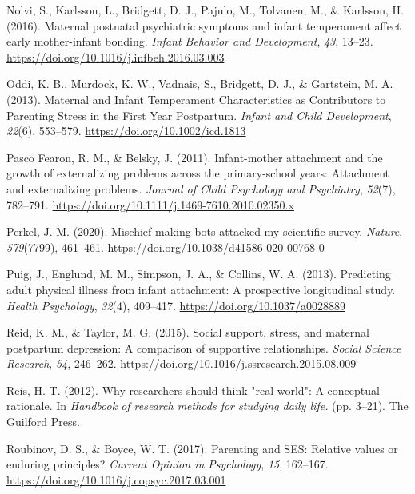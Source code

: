 \documentclass[
]{article}
\newlength{\cslhangindent}
\newenvironment{CSLReferences}[2] %
 {\begin{list}{}{%
  \setlength{\itemindent}{0pt}
  \setlength{\leftmargin}{0pt}
  \setlength{\parsep}{0pt}
  \ifodd #1
   \setlength{\leftmargin}{\cslhangindent}
   \setlength{\itemindent}{-1\cslhangindent}
  \fi
  \setlength{\itemsep}{#2\baselineskip}}}
 {\end{list}}
\begin{document}
\begin{CSLReferences}{1}{0}
Nolvi, S., Karlsson, L., Bridgett, D. J., Pajulo, M., Tolvanen, M., \&
Karlsson, H. (2016). Maternal postnatal psychiatric symptoms and infant
temperament affect early mother-infant bonding. \emph{Infant Behavior
and Development}, \emph{43}, 13--23.
\url{https://doi.org/10.1016/j.infbeh.2016.03.003}

Oddi, K. B., Murdock, K. W., Vadnais, S., Bridgett, D. J., \& Gartstein,
M. A. (2013). Maternal and {Infant} {Temperament} {Characteristics} as
{Contributors} to {Parenting} {Stress} in the {First} {Year}
{Postpartum}. \emph{Infant and Child Development}, \emph{22}(6),
553--579. \url{https://doi.org/10.1002/icd.1813}

Pasco Fearon, R. M., \& Belsky, J. (2011). Infant-mother attachment and
the growth of externalizing problems across the primary-school years:
{Attachment} and externalizing problems. \emph{Journal of Child
Psychology and Psychiatry}, \emph{52}(7), 782--791.
\url{https://doi.org/10.1111/j.1469-7610.2010.02350.x}

Perkel, J. M. (2020). Mischief-making bots attacked my scientific
survey. \emph{Nature}, \emph{579}(7799), 461--461.
\url{https://doi.org/10.1038/d41586-020-00768-0}

Puig, J., Englund, M. M., Simpson, J. A., \& Collins, W. A. (2013).
Predicting adult physical illness from infant attachment: {A}
prospective longitudinal study. \emph{Health Psychology}, \emph{32}(4),
409--417. \url{https://doi.org/10.1037/a0028889}

Reid, K. M., \& Taylor, M. G. (2015). Social support, stress, and
maternal postpartum depression: {A} comparison of supportive
relationships. \emph{Social Science Research}, \emph{54}, 246--262.
\url{https://doi.org/10.1016/j.ssresearch.2015.08.009}

Reis, H. T. (2012). Why researchers should think "real-world": {A}
conceptual rationale. In \emph{Handbook of research methods for studying
daily life.} (pp. 3--21). The Guilford Press.

Roubinov, D. S., \& Boyce, W. T. (2017). Parenting and {SES}: {Relative}
values or enduring principles? \emph{Current Opinion in Psychology},
\emph{15}, 162--167. \url{https://doi.org/10.1016/j.copsyc.2017.03.001}


\end{CSLReferences}
\end{document}
